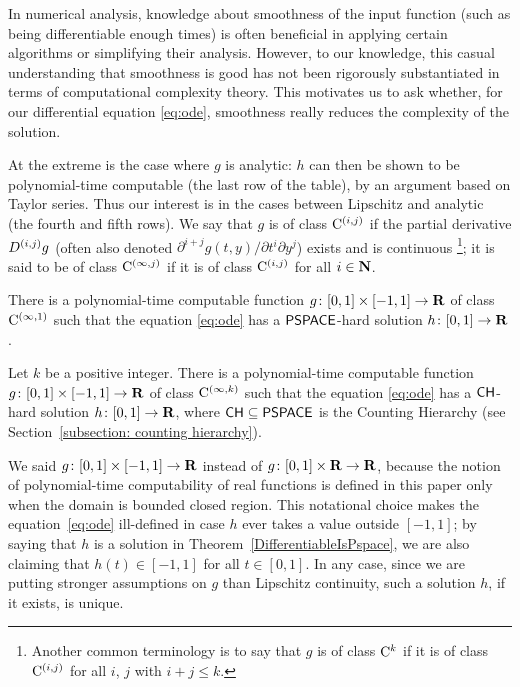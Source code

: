 In numerical analysis, 
knowledge about smoothness of the input function 
(such as being differentiable enough times) 
is often beneficial 
in applying certain algorithms or simplifying their analysis.
However, 
to our knowledge, 
this casual understanding that smoothness is good 
has not been rigorously substantiated 
in terms of computational complexity theory. 
This motivates us to ask whether, 
for our differential equation \eqref{eq:ode}, 
smoothness really reduces the complexity of the solution. 

At the extreme is the case where $g$ is analytic: 
$h$ can then be shown to be polynomial-time computable 
(the last row of the table), 
by an argument based on Taylor series. 
Thus our interest is in 
the cases between Lipschitz and analytic 
(the fourth and fifth rows). 
We say that $g$ is of class $\mathrm C ^{(i, j)}$
if the partial derivative $D ^{(i, j)} g$ 
(often also denoted $\partial ^{i + j} g (t, y) / \partial t ^i \partial y ^j$)
exists and is continuous%
\footnote{%
Another common terminology is to say that $g$ is of class $\mathrm C ^k$
if it is of class $\mathrm C ^{(i,j)}$ 
for all $i$, $j$ with $i + j \leq k$.}; 
it is said to be of class $\mathrm C ^{(\infty, j)}$ if
it is of class $\mathrm C ^{(i, j)}$ for all $i \in \mathbf N$. 

\begin{theorem}
 \label{DifferentiableIsPspace}
There is a polynomial-time computable function
$g \colon [0,1] \times [-1,1] \to \mathbf R$ 
of class $\mathrm C ^{(\infty, 1)}$ such that
the equation \eqref{eq:ode} has a 
$\mathsf{PSPACE}$-hard solution $h \colon [0, 1] \to \mathbf R$. 
 \end{theorem}

 \begin{theorem}
  \label{KTimesIsCH}
Let $k$ be a positive integer. 
There is a polynomial-time computable function
$g \colon [0,1] \times [-1,1] \to \mathbf R$ 
of class $\mathrm C ^{(\infty, k)}$ such that
the equation \eqref{eq:ode} has a 
$\mathsf{CH}$-hard solution $h \colon [0, 1] \to \mathbf R$, 
where $\mathsf{CH} \subseteq \mathsf{PSPACE}$ is the 
Counting Hierarchy (see Section~\ref{subsection: counting hierarchy}). 
 \end{theorem}

We said
$g \colon [0,1] \times [-1, 1] \to \mathbf R$ instead of 
$g \colon [0,1] \times \mathbf R \to \mathbf R$, because
the notion of polynomial-time computability of real functions 
is defined in this paper only when the domain is bounded closed region. 
This notational choice makes
the equation~\eqref{eq:ode} ill-defined 
in case $h$ ever takes a value outside $[-1, 1]$; 
by saying that $h$ is a solution in Theorem~\ref{DifferentiableIsPspace}, 
we are also claiming that 
$h (t) \in [-1, 1]$ for all $t \in [0, 1]$. 
In any case, 
since we are putting stronger assumptions on $g$ than Lipschitz continuity, 
such a solution $h$, if it exists, is unique. 

